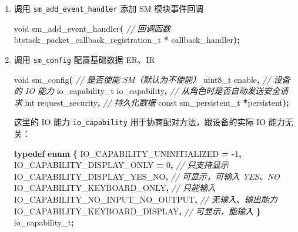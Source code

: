\documentclass[
  12pt,
]{book}
\newenvironment{Shaded}{\begin{snugshade}}{\end{snugshade}}
\newcommand{\CommentTok}[1]{\textcolor[rgb]{0.56,0.35,0.01}{\textit{#1}}}
\newcommand{\DataTypeTok}[1]{\textcolor[rgb]{0.13,0.29,0.53}{#1}}
\newcommand{\DecValTok}[1]{\textcolor[rgb]{0.00,0.00,0.81}{#1}}
\newcommand{\KeywordTok}[1]{\textcolor[rgb]{0.13,0.29,0.53}{\textbf{#1}}}
\newcommand{\NormalTok}[1]{#1}
\newcommand{\OperatorTok}[1]{\textcolor[rgb]{0.81,0.36,0.00}{\textbf{#1}}}
\begin{document}
\begin{enumerate}
\def\labelenumi{\arabic{enumi}.}
\item
  调用 \texttt{sm\_add\_event\_handler} 添加 SM 模块事件回调

\begin{Shaded}
\begin{Highlighting}[]
\DataTypeTok{void}\NormalTok{ sm\_add\_event\_handler}\OperatorTok{(}
  \CommentTok{// 回调函数}
\NormalTok{  btstack\_packet\_callback\_registration\_t }\OperatorTok{*}\NormalTok{ callback\_handler}\OperatorTok{);}
\end{Highlighting}
\end{Shaded}
\item
  调用 \texttt{sm\_config} 配置基础数据 ER、IR

\begin{Shaded}
\begin{Highlighting}[]
\DataTypeTok{void}\NormalTok{ sm\_config}\OperatorTok{(}
  \CommentTok{// 是否使能 SM（默认为不使能）}
  \DataTypeTok{uint8\_t}\NormalTok{ enable}\OperatorTok{,}
  \CommentTok{// 设备的 IO 能力}
\NormalTok{  io\_capability\_t io\_capability}\OperatorTok{,}
  \CommentTok{// 从角色时是否自动发送安全请求}
  \DataTypeTok{int}\NormalTok{   request\_security}\OperatorTok{,}
  \CommentTok{// 持久化数据}
  \DataTypeTok{const}\NormalTok{ sm\_persistent\_t }\OperatorTok{*}\NormalTok{persistent}\OperatorTok{);}
\end{Highlighting}
\end{Shaded}

  这里的 IO 能力 \texttt{io\_capability} 用于协商配对方法，跟设备的实际 IO 能力无关：

\begin{Shaded}
\begin{Highlighting}[]
\KeywordTok{typedef} \KeywordTok{enum} \OperatorTok{\{}
\NormalTok{  IO\_CAPABILITY\_UNINITIALIZED }\OperatorTok{=} \OperatorTok{{-}}\DecValTok{1}\OperatorTok{,}
\NormalTok{  IO\_CAPABILITY\_DISPLAY\_ONLY }\OperatorTok{=} \DecValTok{0}\OperatorTok{,}   \CommentTok{// 只支持显示}
\NormalTok{  IO\_CAPABILITY\_DISPLAY\_YES\_NO}\OperatorTok{,}     \CommentTok{// 可显示，可输入 YES、NO}
\NormalTok{  IO\_CAPABILITY\_KEYBOARD\_ONLY}\OperatorTok{,}      \CommentTok{// 只能输入}
\NormalTok{  IO\_CAPABILITY\_NO\_INPUT\_NO\_OUTPUT}\OperatorTok{,} \CommentTok{// 无输入、输出能力}
\NormalTok{  IO\_CAPABILITY\_KEYBOARD\_DISPLAY}\OperatorTok{,}   \CommentTok{// 可显示，能输入}
\OperatorTok{\}}\NormalTok{ io\_capability\_t}\OperatorTok{;}
\end{Highlighting}
\end{Shaded}


\end{enumerate}
\end{document}
